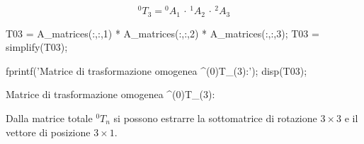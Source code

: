 \documentclass[11pt, a4paper]{article}
\begin{document}
\begin{par}
$$^0 T_3 = {}^0 A_1 \,\cdot\, {}^1 A_2 \,\cdot\, {}^{2} A_3$$
\end{par}

\begin{matlabcode}
T03 = A_matrices(:,:,1) * A_matrices(:,:,2) * A_matrices(:,:,3);
T03 = simplify(T03);

fprintf('Matrice di trasformazione omogenea ^(0)T_(3):\n');
disp(T03);
\end{matlabcode}
\begin{matlaboutput}
Matrice di trasformazione omogenea ^(0)T_(3):
\end{matlaboutput}

\begin{par}
\begin{flushleft}
Dalla matrice totale $^0 T_n$ si possono estrarre la sottomatrice di rotazione $3\times 3$ e il vettore di posizione $3\times 1$.
\end{flushleft}
\end{par}
\end{document}
